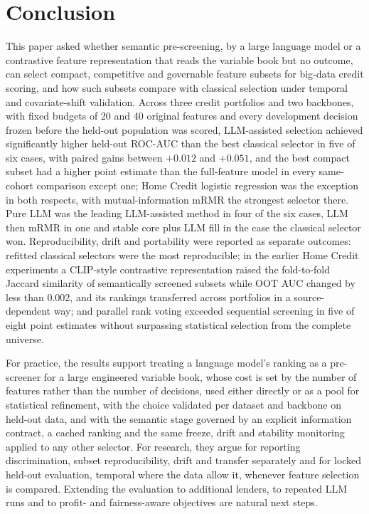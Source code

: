 \documentclass[final,5p,twocolumn]{elsarticle}
\begin{document}

\section{Conclusion}
\label{sec:conclusion}

This paper asked whether semantic pre-screening, by a large language model or a contrastive feature representation that reads the variable book but no outcome, can select compact, competitive and governable feature subsets for big-data credit scoring, and how such subsets compare with classical selection under temporal and covariate-shift validation. Across three credit portfolios and two backbones, with fixed budgets of 20 and 40 original features and every development decision frozen before the held-out population was scored, LLM-assisted selection achieved significantly higher held-out ROC-AUC than the best classical selector in five of six cases, with paired gains between $+0.012$ and $+0.051$, and the best compact subset had a higher point estimate than the full-feature model in every same-cohort comparison except one; Home Credit logistic regression was the exception in both respects, with mutual-information mRMR the strongest selector there. Pure LLM was the leading LLM-assisted method in four of the six cases, LLM then mRMR in one and stable core plus LLM fill in the case the classical selector won. Reproducibility, drift and portability were reported as separate outcomes: refitted classical selectors were the most reproducible; in the earlier Home Credit experiments a CLIP-style contrastive representation raised the fold-to-fold Jaccard similarity of semantically screened subsets while OOT AUC changed by less than 0.002, and its rankings transferred across portfolios in a source-dependent way; and parallel rank voting exceeded sequential screening in five of eight point estimates without surpassing statistical selection from the complete universe.

For practice, the results support treating a language model's ranking as a pre-screener for a large engineered variable book, whose cost is set by the number of features rather than the number of decisions, used either directly or as a pool for statistical refinement, with the choice validated per dataset and backbone on held-out data, and with the semantic stage governed by an explicit information contract, a cached ranking and the same freeze, drift and stability monitoring applied to any other selector. For research, they argue for reporting discrimination, subset reproducibility, drift and transfer separately and for locked held-out evaluation, temporal where the data allow it, whenever feature selection is compared. Extending the evaluation to additional lenders, to repeated LLM runs and to profit- and fairness-aware objectives are natural next steps.
\end{document}
